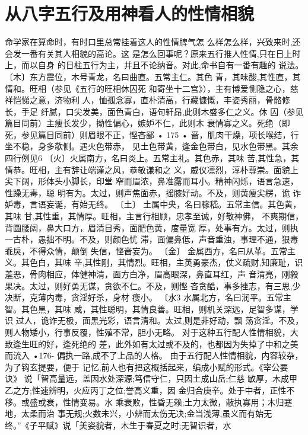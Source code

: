 \section{从八字五行及用神看人的性情相貌}
命学家在算命时，有时口里总常挂着这人的性情脾气怎
么样怎么样，兴致来时,还会发一番有关其人相貌的高论。这
是怎么回事呢？原来五行推人性情,只在日上时上，而以自身
的日柱五行为主，并且不论纳音。对此,命书自有一番有趣的
说法。
〔木〕东方震位，木号青龙，名曰曲直。五常主仁。其色
青，其味酸,其性直，其情和。旺相（参见《五行的旺相休囚死
和寄坐十二宫》），主有博爱恻隐之心，慈祥恺悌之意，济物利
人，恤孤念寡，直朴清高，行藏慷慨，丰姿秀丽，骨骼修长，手足
纤腻，口尖发美，面色青白，语句轩昂,此则木盛多仁之义。休
囚（参见篇目同前）主瘦长发少，拗性偏心，嫉妒不仁，此则木
衰情寡之义。死绝（即死，参见篇目同前）则眉眼不正，悭吝鄙
• 175 •
啬，肌肉干燥，项长喉结，行坐不稳，身多欹侧。遇火色带赤，
见土色带黄，逢金色带白，见水色带黑。其余四行例见6
〔火〕火属南方，名曰炎上。五常主礼。其色赤，其味
苦,其性急，其情恭。旺相，主有辞让端谨之风，恭敬谦和之
义，威仪凛烈，淳朴尊崇。面貌上尖下阔，形体头小脚长，印堂
窄而眉浓，鼻准露而耳小。精神闪烁，语言急速，性躁无毒，聪
明有为。太过，则声焦面赤，摇膝好动。不及，则黄瘦尖楞，诡
诈妒毒，言语妄诞，有始无终。
〔土〕 土属中央，名曰稼嵇。五常主信。其色黄，其味
甘,其性重，其情厚。旺相，主言行相顾，忠孝至诚，好敬神佛，
不爽期信，背圆腰阔，鼻大口方，眉清目秀，面肥色黄，度量宽
厚，处事有方。太过，则执一古朴，愚拙不明。不及，则颜色忧
滞，面偏鼻低，声音重浊，事理不通，狠毒乖戾，不得众情，颠倒
失信，悭啬妄为。
〔金〕 金属西方，名曰从革。五常主义。其色白，其味
辛,其性刚，其情烈。旺相，主英勇豪杰，仗义疏财,知廉耻，识
羞恶，骨肉相应，体健神清，面方白净，眉高眼深，鼻直耳红，声
音清亮，刚毅果决。太过，则好勇无谋，贪欲不仁。不及，则悭
吝贪酷，事多挫志，有三思,少决断，克薄内毒，贪淫好杀，身材
瘦小。
〔水3 水属北方，名曰润平。五常主智。其色黑，其味
咸，其性聪明，其情良善。旺相，则机关深远，足智多谋，学识
过人，诡诈无极，面黑光彩，语言清和。太过,则是非好动，飘
荡贪淫。不及，则人物矮小，行事反覆，性殖不常，胆小无略。
对于这种五行配人性情相貌，大致逢生旺的好，逢死绝的
差，此外如有太过或不及的，也都因为失掉了中和之美而流入
•176-
偏执一路,成不了上品的人格。
由于五行配人性情相貌，内容较杂，为了钩玄提要，便于
记忆,前人也有把这概括起来，编成小赋的形式。《宰公要诀》
说「智高量远，盖因水处深源;笃信守仁，只因土成山岳;仁慈
敏厚，木成甲乙之方;性速辨明，火应丙丁之位;誉高义重，因
金归合庚辛。处于中者，正性不移。或盛或衰，性情变易。水
乘衰败，性昏无赖;土力太微，蔽执寡用；木归蹇地，太柔而治
事无规;火数未兴，小辨而太伤无决;金当浅薄,虽义而有始无
终。”《子平赋》说「美姿貌者，木生于春夏之时;无智识者，水
